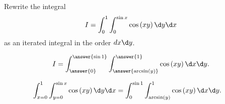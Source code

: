 \documentclass{ximera}
\author{Jim Fowler}
\begin{document}
\begin{exercise}
Rewrite the integral
\[
I = \int_{0}^1 \int_{0}^{\sin x} \cos \left( x y \right) \d y \d x
\]
as an iterated integral in the order $dx \d y$.

\[
  I = \int_{\answer{0}}^{\answer{\sin 1}} \int_{\answer{\arcsin(y)}}^{\answer{1}} \cos \left( x y \right) \d x \d y.
\]


\begin{hint}
  \begin{align*}
\int_{x = 0}^1 \int_{y = 0}^{\sin x} \cos \left( x y \right) \d y \d x
&= \int_{0}^{\sin 1} \int_{\arcsin(y)}^1 \cos \left( x y \right) \d x \d y.
  \end{align*}
\end{hint}

\end{exercise}
\end{document}
